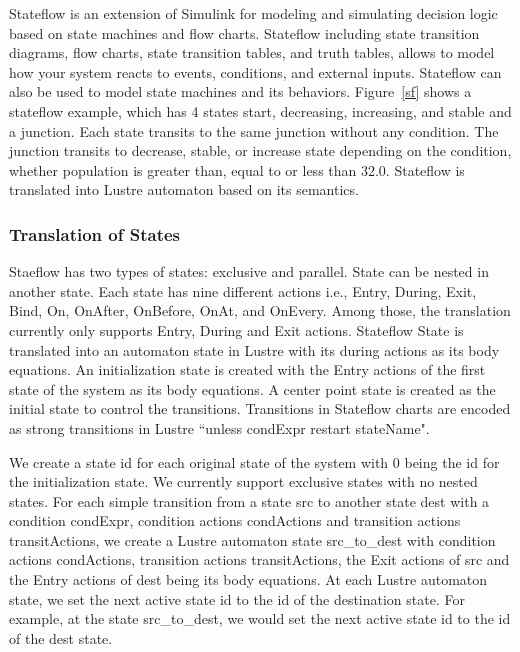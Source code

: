 \documentclass{article}
\begin{document}
Stateflow is an extension of Simulink for modeling and simulating decision logic based on state machines and flow charts. 
Stateflow including state transition diagrams, flow charts, state transition tables, and truth tables, allows to model how your system reacts to events, conditions, and external inputs.
Stateflow can also be used to model state machines and its behaviors. 
Figure~\ref{sf} shows a stateflow example, which has 4 states start, decreasing, increasing, and stable and a junction. 
Each state transits to the same junction without any condition. 
The junction transits to decrease, stable, or increase state depending on the condition, whether \textsf{population} is greater than, equal to or less than 32.0. 
Stateflow is translated into Lustre automaton based on its semantics. 

\subsubsection{Translation of States}
Staeflow has two types of states: exclusive and parallel. 
State can be nested in another state.
Each state has nine different actions i.e., Entry, During, Exit, Bind, On, OnAfter, OnBefore, OnAt, and OnEvery. 
Among those, the translation currently only supports Entry, During and Exit actions. 
Stateflow State is translated into an automaton state in Lustre with its during actions as its body equations.
An initialization state is created with the Entry actions of the first state of the system as its body equations. 
A center point state is created as the initial state to control the transitions. 
Transitions in Stateflow charts are encoded as strong transitions in Lustre ``\textsf{unless} condExpr \textsf{restart} stateName".

We create a state id for each original state of the system with 0 being the id for the initialization state.
We currently support exclusive states with no nested states.
For each simple transition from a state \textsf{src} to another state \textsf{dest} with a condition \textsf{condExpr}, condition actions \textsf{condActions} and transition actions \textsf{transitActions}, we create a Lustre automaton state  \textsf{src\_to\_dest} with condition actions \textsf{condActions}, transition actions \textsf{transitActions}, the Exit actions of \textsf{src} and the Entry actions of \textsf{dest} being its body equations.
At each Lustre automaton state, we set the next active state id to the id of the destination state.
For example, at the state \textsf{src\_to\_dest}, we would set the next active state id to the id of the \textsf{dest} state.
\end{document}
